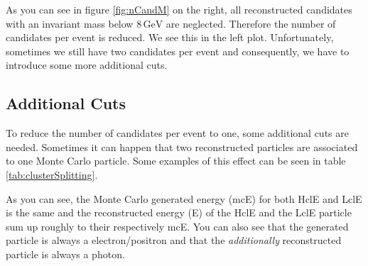 \documentclass[a4paper,11pt,twosided,final,german,openbib,pdftex,listof=totoc,bibliography=totoc]{scrbook}
\begin{document}
As you can see in figure \ref{fig:nCandM} on the right, all reconstructed candidates with an invariant mass below $8\,\textrm{GeV}$ are neglected. Therefore the number of candidates per event is reduced. We see this in the left plot. Unfortunately, sometimes we still have two candidates per event and consequently, we have to introduce some more additional cuts.



\subsection{Additional Cuts}

To reduce the number of candidates per event to one, some additional cuts are needed. Sometimes it can happen that two reconstructed particles are associated to one Monte Carlo particle. Some examples of this effect can be seen in table \ref{tab:clusterSplitting}. 


\begin{table}[h!]
	\centering
	\caption[Cluster Splitting Examples]{Some examples for events with cluster splitting. mcE is the same for LclE and HclE. The energies are in GeV. }
	\label{tab:clusterSplitting}
\end{table}




As you can see, the Monte Carlo generated energy (mcE) for both HclE and LclE is the same and the reconstructed energy (E) of the HclE and the LclE particle sum up roughly to their respectively mcE. You can also see that the generated particle is always a electron/positron and that the \textit{additionally} reconstructed particle is always a photon.
\end{document}
